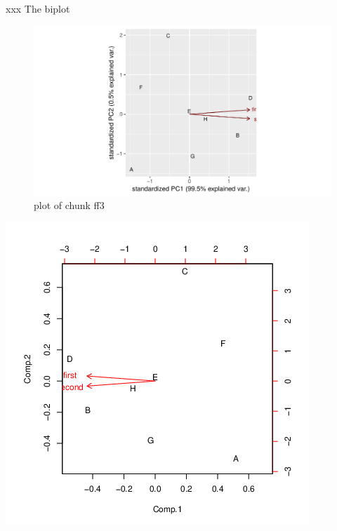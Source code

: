 \documentclass[ignorenonframetext,]{beamer}
\begin{document}
\begin{frame}{xxx The biplot}
\protect\hypertarget{xxx-the-biplot-1}{}

\begin{figure}
\centering
\includegraphics{figure/ff3-1.pdf}
\caption{plot of chunk ff3}
\end{figure}

\includegraphics{bPrincomp-test-biplot.png}

\end{frame}
\end{document}

